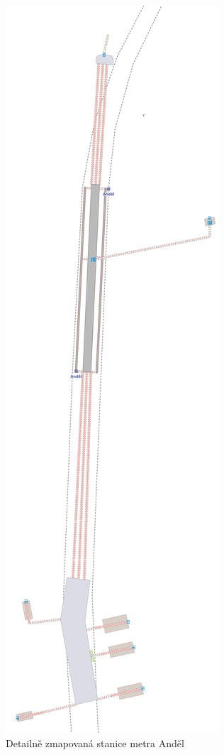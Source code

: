 \begin{figure}
  \centering
    \includegraphics[height=0.99\textheight]{../img/andel.pdf}
  \caption{Detailně zmapovaná stanice metra Anděl}
  \label{fig:metro-detail}
\end{figure}

